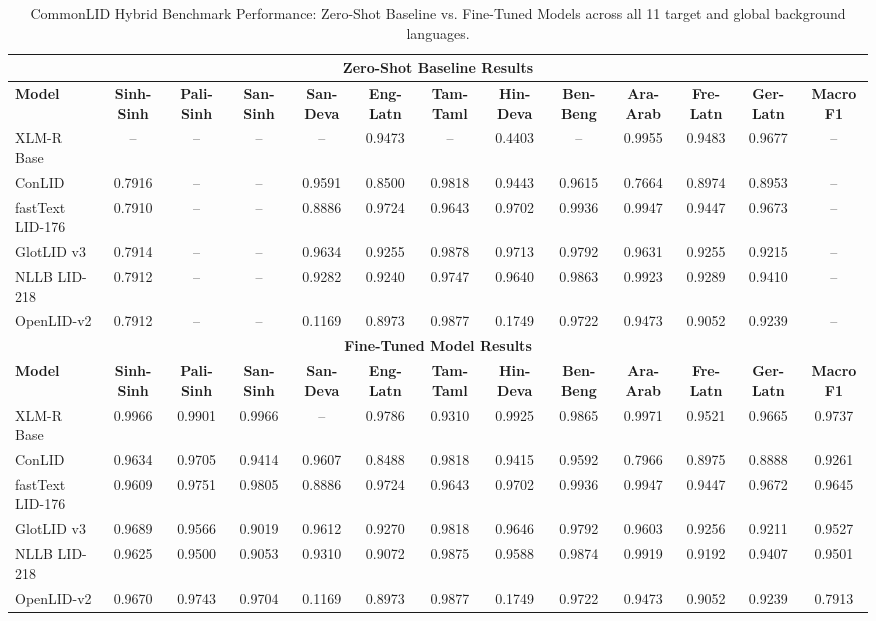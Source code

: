 \documentclass[11pt]{article}
\begin{document}
\begin{table}[p]
\vspace{12pt}

\caption{CommonLID Hybrid Benchmark Performance: Zero-Shot Baseline vs. Fine-Tuned Models across all 11 target and global background languages.}
\label{tab:common_full}
\begin{tabular}{l ccc cccccccc c}
\toprule
\multicolumn{13}{c}{\textbf{Zero-Shot Baseline Results}} \\
\midrule
\textbf{Model} & \textbf{Sinh-Sinh} & \textbf{Pali-Sinh} & \textbf{San-Sinh} & \textbf{San-Deva} & \textbf{Eng-Latn} & \textbf{Tam-Taml} & \textbf{Hin-Deva} & \textbf{Ben-Beng} & \textbf{Ara-Arab} & \textbf{Fre-Latn} & \textbf{Ger-Latn} & \textbf{Macro F1} \\
\midrule
XLM-R Base & -- & -- & -- & -- & 0.9473 & -- & 0.4403 & -- & 0.9955 & 0.9483 & 0.9677 & -- \\
ConLID & 0.7916 & -- & -- & 0.9591 & 0.8500 & 0.9818 & 0.9443 & 0.9615 & 0.7664 & 0.8974 & 0.8953 & -- \\
fastText LID-176 & 0.7910 & -- & -- & 0.8886 & 0.9724 & 0.9643 & 0.9702 & 0.9936 & 0.9947 & 0.9447 & 0.9673 & -- \\
GlotLID v3 & 0.7914 & -- & -- & 0.9634 & 0.9255 & 0.9878 & 0.9713 & 0.9792 & 0.9631 & 0.9255 & 0.9215 & -- \\
NLLB LID-218 & 0.7912 & -- & -- & 0.9282 & 0.9240 & 0.9747 & 0.9640 & 0.9863 & 0.9923 & 0.9289 & 0.9410 & -- \\
OpenLID-v2 & 0.7912 & -- & -- & 0.1169 & 0.8973 & 0.9877 & 0.1749 & 0.9722 & 0.9473 & 0.9052 & 0.9239 & -- \\
\midrule
\multicolumn{13}{c}{\textbf{Fine-Tuned Model Results}} \\
\midrule
\textbf{Model} & \textbf{Sinh-Sinh} & \textbf{Pali-Sinh} & \textbf{San-Sinh} & \textbf{San-Deva} & \textbf{Eng-Latn} & \textbf{Tam-Taml} & \textbf{Hin-Deva} & \textbf{Ben-Beng} & \textbf{Ara-Arab} & \textbf{Fre-Latn} & \textbf{Ger-Latn} & \textbf{Macro F1} \\
\midrule
XLM-R Base & 0.9966 & 0.9901 & 0.9966 & -- & 0.9786 & 0.9310 & 0.9925 & 0.9865 & 0.9971 & 0.9521 & 0.9665 & 0.9737 \\
ConLID & 0.9634 & 0.9705 & 0.9414 & 0.9607 & 0.8488 & 0.9818 & 0.9415 & 0.9592 & 0.7966 & 0.8975 & 0.8888 & 0.9261 \\
fastText LID-176 & 0.9609 & 0.9751 & 0.9805 & 0.8886 & 0.9724 & 0.9643 & 0.9702 & 0.9936 & 0.9947 & 0.9447 & 0.9672 & 0.9645 \\
GlotLID v3 & 0.9689 & 0.9566 & 0.9019 & 0.9612 & 0.9270 & 0.9818 & 0.9646 & 0.9792 & 0.9603 & 0.9256 & 0.9211 & 0.9527 \\
NLLB LID-218 & 0.9625 & 0.9500 & 0.9053 & 0.9310 & 0.9072 & 0.9875 & 0.9588 & 0.9874 & 0.9919 & 0.9192 & 0.9407 & 0.9501 \\
OpenLID-v2 & 0.9670 & 0.9743 & 0.9704 & 0.1169 & 0.8973 & 0.9877 & 0.1749 & 0.9722 & 0.9473 & 0.9052 & 0.9239 & 0.7913 \\
\bottomrule
\end{tabular}


\end{table}
\end{document}
